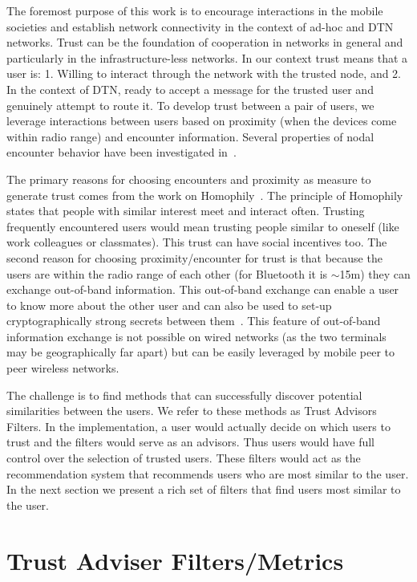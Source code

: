 \documentclass[10pt,conference]{IEEEtran}
\begin{document}
The foremost purpose of this work is to encourage interactions in the mobile societies and establish network connectivity in the context of ad-hoc and DTN networks. Trust can be the foundation of cooperation in networks in general and particularly in the infrastructure-less networks. In our context trust means that a user is: 1. Willing to interact through the network with the trusted node, and 2. In the context of DTN, ready to accept a message for the trusted user and genuinely attempt to route it.  To develop trust between a pair of users, we  leverage interactions between users based on proximity (when the devices come within radio range) and encounter information. Several properties of nodal encounter behavior have been investigated in~\cite{nodal}.


The primary reasons for choosing encounters and proximity as measure to generate trust comes from the work on Homophily~\cite{homophily}. The principle of Homophily states that people with similar interest meet and interact often. Trusting  frequently encountered users would mean trusting people similar to oneself (like work colleagues or classmates). This trust can have social incentives too. The second reason for choosing proximity/encounter for trust is that because the users are within the radio range of each other (for Bluetooth it is $\sim$15m) they can exchange out-of-band information. This out-of-band exchange can enable a user to know more about the other user and can also be used to set-up cryptographically strong secrets between them~\cite{gangs}. This feature of out-of-band information exchange is not possible on wired networks (as the two terminals may be geographically far apart) but can be easily leveraged by mobile peer to peer wireless networks.

The challenge is to find methods that can successfully discover potential similarities between the users. We refer to these methods  as Trust  Advisors Filters.  In the implementation, a user would actually decide on which users to trust and the filters would serve as an advisors. Thus users would have full control over the selection of trusted users. These filters would act as the recommendation system that recommends users who are most similar to the user. In the next section we present a rich set of filters that find users most similar to the user.



\section{Trust Adviser Filters/Metrics}  \label{trust_filter}
\end{document}
